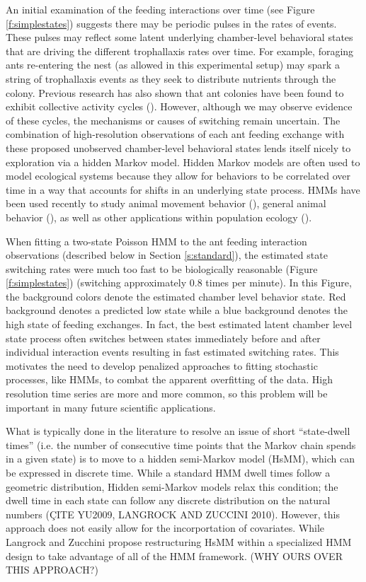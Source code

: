 \documentclass[ba]{imsart}
\begin{document}
	An initial examination of the feeding interactions over time (see Figure \ref{f:simplestates}) suggests there may be periodic pulses in the rates of events. These pulses may reflect some latent underlying chamber-level behavioral states that are driving the different trophallaxis rates over time. For example, foraging ants re-entering the nest (as allowed in this experimental setup) may spark a string of trophallaxis events as they seek to distribute nutrients through the colony. Previous research has also shown that ant colonies have been found to exhibit collective activity cycles (\cite{Richardson2017}). However, although we may observe evidence of these cycles, the mechanisms or causes of switching remain uncertain. The combination of high-resolution observations of each ant feeding exchange with these proposed unobserved chamber-level behavioral states lends itself nicely to exploration via a hidden Markov model. Hidden Markov models are often used to model ecological systems because they allow for behaviors to be correlated over time in a way that accounts for shifts in an underlying state process. HMMs have been used recently  to study animal movement behavior (\cite{Langrock2012,McKellar2015, Patterson2017,Towner2016, VandeKerk2015}), general animal behavior (\cite{DeRuiter2016,Langrock2014,Schliehe-Diecks2012}), as well as other applications within population ecology (\cite{Borchers2013,Gimenez2014, Johnson2016, Leos-Barajas2017a}). 
    
    When fitting a two-state Poisson HMM to the ant feeding interaction observations (described below in Section \ref{s:standard}), the estimated state switching rates were much too fast to be biologically reasonable (Figure \ref{f:simplestates}) (switching approximately 0.8 times per minute). In this Figure, the background colors denote the estimated chamber level behavior state. Red background denotes a predicted low state while a blue background denotes the high state of feeding exchanges.  In fact, the best estimated latent chamber level state process often switches between states immediately before and after individual interaction events resulting in fast estimated switching rates. This motivates the need to develop penalized approaches to fitting stochastic processes, like HMMs, to combat the apparent overfitting of the data. High resolution time series are more and more common, so this problem will be important in many future scientific applications. 

    What is typically done in the literature to resolve an issue of short ``state-dwell times'' (i.e. the number of consecutive time points that the Markov chain spends in a given state) is to move to a hidden semi-Markov model (HsMM), which can be expressed in discrete time. While a standard HMM dwell times follow a geometric distribution, Hidden semi-Markov models relax this condition; the dwell time in each state can follow any discrete distribution on the natural numbers (\c CITE YU2009, LANGROCK AND ZUCCINI 2010). However, this approach does not easily allow for the incorportation of covariates. While Langrock and Zucchini propose restructuring HsMM within a specialized HMM design to take advantage of all of the HMM framework. (WHY OURS OVER THIS APPROACH?)
\end{document}
